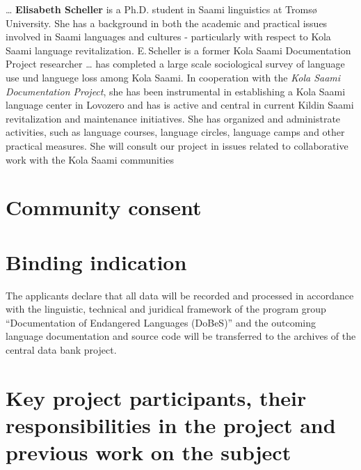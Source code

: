 \documentclass[a4paper,12pt]{article}
\begin{document}
{{{{… {\bf Elisabeth Scheller} is a Ph.D. student in Saami linguistics at Tromsø University. She has a background in both the academic and practical issues involved in Saami languages and cultures - particularly with respect to Kola Saami language revitalization. E.\,Scheller is a former Kola Saami Documentation Project researcher … has completed a large scale sociological survey of language use und languege loss among Kola Saami. In cooperation with the {\it Kola Saami Documentation Project}, she has been instrumental in establishing a Kola Saami language center in Lovozero and has is active and central in current Kildin Saami revitalization and maintenance initiatives. She has organized and administrate activities, such as language courses, language circles, language camps and other practical measures. She will consult our project in issues related to collaborative work with the Kola Saami communities
 



\section{Community consent}

\section{Binding indication}

The applicants declare that all data will be recorded and processed in accordance with the linguistic, technical and juridical framework of the program group “Documentation of Endangered Languages (DoBeS)” and the outcoming language documentation and source code will be transferred to the archives of the central data bank project.

\section{Key project participants, their responsibilities in the project and previous work on the subject}

}}}}
\end{document}
